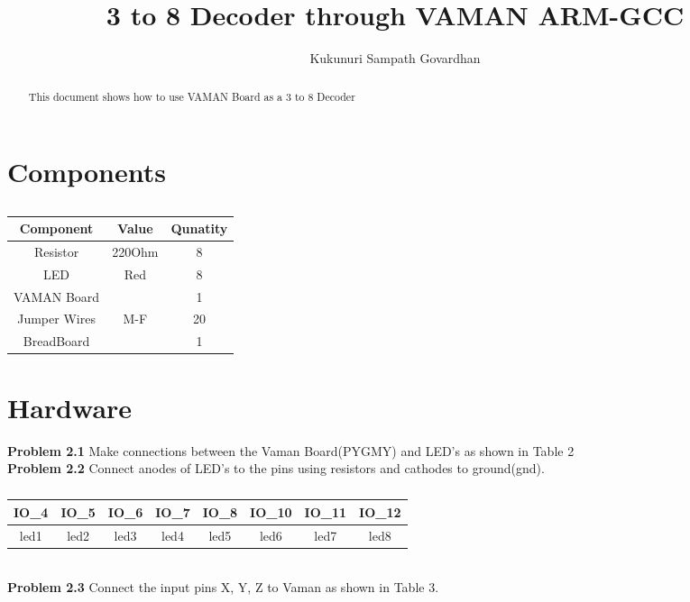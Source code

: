 \documentclass[journal,12pt,twocolumn]{IEEEtran}
\title{
3 to 8 Decoder through VAMAN ARM-GCC
}
\author{Kukunuri Sampath Govardhan}
\begin{document}
\maketitle
\tableofcontents
\begin{abstract}
This document shows how to use VAMAN Board as a 3 to 8 Decoder
\end{abstract}
\section{Components}
\begin{table}[h]
    \centering
    \begin{tabular}{| c | c | c |}
       \hline
       \textbf{Component}  &  \textbf{Value}  &  \textbf{Qunatity}\\
       \hline
         Resistor  &  220Ohm  &  8  \\
         \hline
         LED  &  Red  &  8  \\
         \hline
         VAMAN Board  &  & 1  \\
         \hline
         Jumper Wires  &  M-F  &  20  \\
         \hline
         BreadBoard  &    &  1\\
         \hline
         
    \end{tabular}
    \caption{}
    \label{tab:my_label}
\end{table}
\section{Hardware}
\textbf{Problem 2.1} Make connections between the Vaman Board(PYGMY) and LED's as shown in Table 2 \\

\textbf{Problem 2.2} Connect anodes of LED's to the pins using resistors and cathodes to ground(gnd).\\
\begin{table}[h]
    \centering
    \begin{tabular}{| c | c | c | c | c | c | c | c |}
        \hline
         IO\_4 & IO\_5 & IO\_6 & IO\_7 & IO\_8 & IO\_10 & IO\_11 & IO\_12  \\
       \hline
       led1 & led2 & led3 & led4 & led5 & led6 & led7 & led8  \\
         \hline
    \end{tabular}
    \caption{}
    \label{tab:my_label}
\end{table}
\\
\textbf{Problem 2.3} Connect the input pins X, Y, Z to Vaman as shown in Table 3.\\
\end{document}
